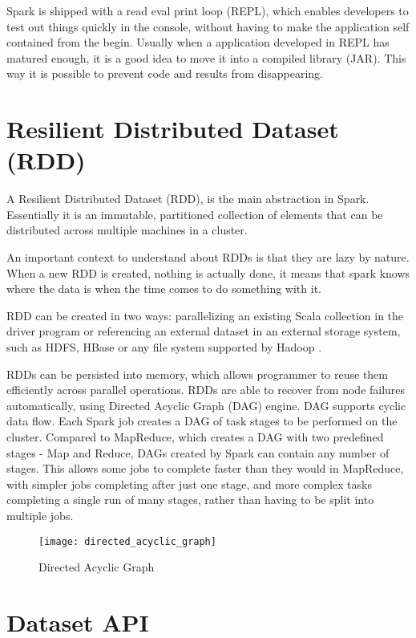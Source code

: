 \documentclass[main.tex]{thesis.tex}
\begin{document}
Spark is shipped with a read eval print loop (REPL), which enables developers to test out things quickly in the console, without having to make the application self contained from the begin.
Usually when a application developed in REPL has matured enough, it is a good idea to move it into a compiled library (JAR).
This way it is possible to prevent code and results from disappearing.

\section{Resilient Distributed Dataset (RDD)}

A Resilient Distributed Dataset (RDD), is the main abstraction in Spark.
Essentially it is an immutable, partitioned collection of elements that can be distributed across multiple machines in a cluster. \cite{spark-rdd}

An important context to understand about RDDs is that they are lazy by nature.
When a new RDD is created, nothing is actually done, it means that spark knows where the data is when the time comes to do something with it.

RDD can be created in two ways: parallelizing an existing Scala collection in the driver program or referencing an external dataset in an external storage system, such as HDFS, HBase or any file system supported by Hadoop \cite{spark-programming-guide}.

RDDs can be persisted into memory, which allows programmer to reuse them efficiently across parallel operations.
RDDs are able to recover from node failures automatically, using Directed Acyclic Graph (DAG) engine.
DAG supports cyclic data flow.
Each Spark job creates a DAG of task stages to be performed on the cluster.
Compared to MapReduce, which creates a DAG with two predefined stages - Map and Reduce, DAGs created by Spark can contain any number of stages.
This allows some jobs to complete faster than they would in MapReduce, with simpler jobs completing after just one stage, and more complex tasks completing a single run of many stages, rather than having to be split into multiple jobs. \cite{mapRSpark}

\begin{figure}[h]
	\caption{Directed Acyclic Graph \cite{dag-image}}
	\centering
	\texttt{[image: directed\_acyclic\_graph]}
\end{figure}

\section{Dataset API}
\end{document}
